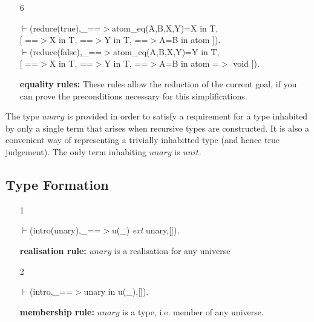 \documentclass[11pt]{report}
\newcommand{\inv}[1]{\index{#1}}
\begin{document}
\begin{enumerate}
 {\bf membership rule:}
 The decision operator is an element of any type $T$,
 provided both the $then$ and the $else$ part of the decision
 operator are elements of $T$.
  
 \item[6]
\begin{sf}\begin{tabbing}
$\vdash$(reduce(true),\_\hspace{0.1em}==$>$atom\_\hspace{0.1em}eq(A,B,X,Y)=X in T, \\[-0.15ex]
\hspace{2em}[ ==$>$X in T, ==$>$Y in T, ==$>$A=B in atom ]).\\[-0.15ex]
$\vdash$(reduce(false),\_\hspace{0.1em}==$>$atom\_\hspace{0.1em}eq(A,B,X,Y)=Y in T, \\[-0.15ex]
\hspace{2em}[ ==$>$X in T, ==$>$Y in T, ==$>$A=B in atom =$>$ void ]).
\end{tabbing}\end{sf}

 {\bf equality rules:}
 These rules allow the reduction of the current goal, if you
 can prove the preconditions necessary for this simplifications.
 \end{enumerate}
  
 \inv{Unary type}
  
 The type $unary$ is provided in order to satisfy a requirement
 for a type inhabited by only a single term that arises when
 recursive types are constructed.   It is also a convenient way of
 representing a trivially inhabitted type (and hence true judgement).
 The only term inhabiting $unary$ is $unit$.
 
 \subsection{Type Formation}
  
 \begin{enumerate}
 \item[1] 
\begin{sf}\begin{tabbing}
$\vdash$(intro(unary),\_\hspace{0.1em}==$>$u(\_\hspace{0.1em}) \mbox{\it ext} unary,[]).
\end{tabbing}\end{sf}

 {\bf realisation rule:} 
 $unary$ is a realisation for any universe
  
 \item[2] 
\begin{sf}\begin{tabbing}
$\vdash$(intro,\_\hspace{0.1em}==$>$unary in u(\_\hspace{0.1em}),[]).
\end{tabbing}\end{sf}

 {\bf membership rule:} 
 $unary$ is a type, i.e. member of any universe.
 \end{enumerate}
  
\end{document}
